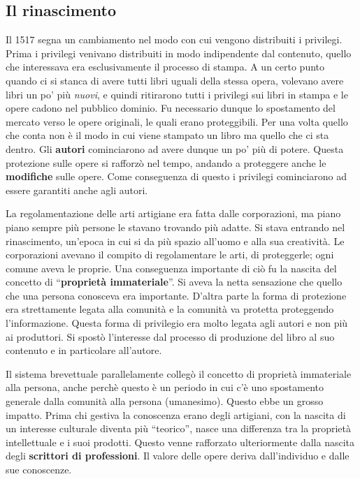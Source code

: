 \subsection{Il rinascimento}

Il 1517 segna un cambiamento nel modo con cui vengono distribuiti i privilegi. Prima i privilegi venivano distribuiti in modo indipendente dal contenuto, quello che interessava era esclusivamente il processo di stampa. A un certo punto quando ci si stanca di avere tutti libri uguali della stessa opera, volevano avere libri un po' più \textit{nuovi}, e quindi ritirarono tutti i privilegi sui libri in stampa e le opere cadono nel pubblico dominio. Fu necessario dunque lo spostamento del mercato verso le opere originali, le quali erano proteggibili. Per una volta quello che conta non è il modo in cui viene stampato un libro ma quello che ci sta dentro. Gli \textbf{autori} cominciarono ad avere dunque un po' più di potere. Questa protezione sulle opere si rafforzò nel tempo, andando a proteggere anche le \textbf{modifiche} sulle opere. Come conseguenza di questo i privilegi cominciarono ad essere garantiti anche agli autori.  

La regolamentazione delle arti artigiane era fatta dalle corporazioni, ma piano piano sempre più persone le stavano trovando più adatte. Si stava entrando nel rinascimento, un'epoca in cui si da più spazio all'uomo e alla sua creatività. Le corporazioni avevano il compito di regolamentare le arti, di proteggerle; ogni comune aveva le proprie. Una conseguenza importante di ciò fu la nascita del concetto di ``\textbf{proprietà immateriale}''. Si aveva la netta sensazione che quello che una persona conosceva era importante. D'altra parte la forma di protezione era strettamente legata alla comunità e la comunità va protetta proteggendo l'informazione. Questa forma di privilegio era molto legata agli autori e non più ai produttori. Si spostò l'interesse dal processo di produzione del libro al suo contenuto e in particolare all'autore.

Il sistema brevettuale parallelamente collegò il concetto di proprietà immateriale alla persona, anche perchè questo è un periodo in cui c'è uno spostamento generale dalla comunità alla persona (umanesimo). Questo ebbe un grosso impatto. Prima chi gestiva la conoscenza erano degli artigiani, con la nascita di un interesse culturale diventa più ``teorico'', nasce una differenza tra la proprietà intellettuale e i suoi prodotti. Questo venne rafforzato ulteriormente dalla nascita degli \textbf{scrittori di professioni}. Il valore delle opere deriva dall'individuo e dalle sue conoscenze.

